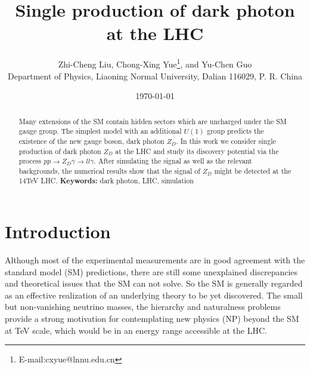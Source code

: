 \documentclass{article}
\title{Single production of dark photon at the LHC}
\author{Zhi-Cheng Liu, Chong-Xing Yue\thanks{E-mail:cxyue@lnnu.edu.cn},  and  Yu-Chen Guo\\
{\small Department of Physics, Liaoning  Normal University, Dalian
116029, P. R. China}
}
\date{\today}
\begin{document}
\maketitle
\begin{abstract}
Many extensions of the SM contain hidden sectors which are uncharged under the SM gauge group. The simplest model with an additional $U(1)$ group predicts the existence of  the new gauge boson, dark photon $Z_D$. In this work we consider single production of dark photon $Z_D$ at the LHC and study its discovery potential  via the process $pp\rightarrow Z_D\gamma\rightarrow ll\gamma$. After simulating the signal as well as the relevant backgrounds, the numerical results show that the signal of $Z_D$ might be detected at the 14TeV LHC.
{\bf Keywords: }dark photon, LHC, simulation
\end{abstract}

  \section{Introduction}
Although most of the experimental measurements are in good agreement with the standard model (SM) predictions, there are still some unexplained  discrepancies and theoretical issues that the SM can not solve\cite{SM}. So the SM is generally regarded as an effective realization of an underlying theory to be  yet discovered. The small but  non-vanishing neutrino masses, the hierarchy and naturalness problems provide a strong motivation for contemplating new physics (NP) beyond the SM at TeV scale, which would be in an energy range accessible at the LHC.
\end{document}
